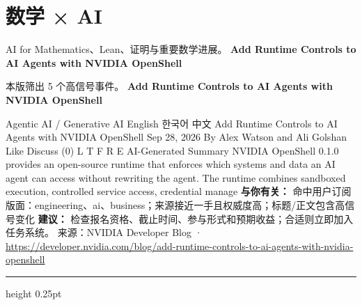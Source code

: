 \documentclass[10.5pt]{ctexart}
\begin{document}
\section*{数学 × AI}
{\color{ormuted} AI for Mathematics、Lean、证明与重要数学进展。}
\vspace{2mm}
{\LARGE\bfseries Add Runtime Controls to AI Agents with NVIDIA OpenShell}\par
\vspace{1mm}
{\color{ormuted} 本版筛出 5 个高信号事件。}
\vspace{3mm}
{\Large\bfseries Add Runtime Controls to AI Agents with NVIDIA OpenShell}\par
Agentic AI / Generative AI English 한국어 中文 Add Runtime Controls to AI Agents with NVIDIA OpenShell Sep 28, 2026 By Alex Watson and Ali Golshan Like Discuss (0) L T F R E AI-Generated Summary NVIDIA OpenShell 0.1.0 provides an open-source runtime that enforces which systems and data an AI agent can access without rewriting the agent. The runtime combines sandboxed execution, controlled service access, credential manage
\textbf{与你有关：} 命中用户订阅版面：engineering、ai、business；来源接近一手且权威度高；标题/正文包含高信号变化
\textbf{建议：} 检查报名资格、截止时间、参与形式和预期收益；合适则立即加入任务系统。
{\footnotesize\color{ormuted} 来源：NVIDIA Developer Blog · \url{https://developer.nvidia.com/blog/add-runtime-controls-to-ai-agents-with-nvidia-openshell}}
\vspace{4mm}
\hrule height 0.25pt
\vspace{3mm}
\end{document}
